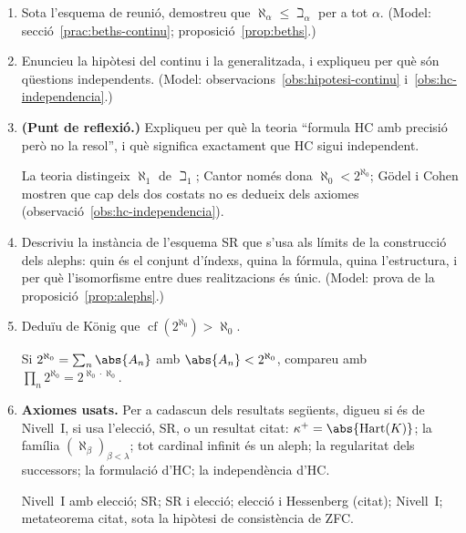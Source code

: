 \begin{enumerate}[resume]
  \item Sota l'esquema de reunió, demostreu que \(\aleph_\alpha\le\beth_\alpha\) per a tot \(\alpha\). (Model: secció~\ref{prac:beths-continu}; proposició~\ref{prop:beths}.)

  \item Enuncieu la hipòtesi del continu i la generalitzada, i expliqueu per què són qüestions independents. (Model: observacions~\ref{obs:hipotesi-continu} i~\ref{obs:hc-independencia}.)

  \item \textbf{(Punt de reflexió.)} Expliqueu per què la teoria \enquote{formula HC amb precisió però no la resol}, i què significa exactament que HC sigui independent. \begin{indicacio}La teoria distingeix \(\aleph_1\) de \(\beth_1\); Cantor només dona \(\aleph_0<2^{\aleph_0}\); Gödel i Cohen mostren que cap dels dos costats no es dedueix dels axiomes (observació~\ref{obs:hc-independencia}).\end{indicacio}

  \item Descriviu la instància de l'esquema SR que s'usa als límits de la construcció dels alephs: quin és el conjunt d'índexs, quina la fórmula, quina l'estructura, i per què l'isomorfisme entre dues realitzacions és únic. (Model: prova de la proposició~\ref{prop:alephs}.)

  \item Deduïu de König que \(\operatorname{cf}(2^{\aleph_0})>\aleph_0\). \begin{indicacio}Si \(2^{\aleph_0}=\sum_n\abs{A_n}\) amb \(\abs{A_n}<2^{\aleph_0}\), compareu amb \(\prod_n2^{\aleph_0}=2^{\aleph_0\cdot\aleph_0}\).\end{indicacio}

  \item \textbf{Axiomes usats.} Per a cadascun dels resultats següents, digueu si és de Nivell~I, si usa l'elecció, SR, o un resultat citat: \(\kappa^+=\abs{\Hart(K)}\); la família \((\aleph_\beta)_{\beta<\lambda}\); tot cardinal infinit és un aleph; la regularitat dels successors; la formulació d'HC; la independència d'HC. \begin{indicacio}Nivell~I amb elecció; SR; SR i elecció; elecció i Hessenberg (citat); Nivell~I; metateorema citat, sota la hipòtesi de consistència de ZFC.\end{indicacio}
\end{enumerate}
